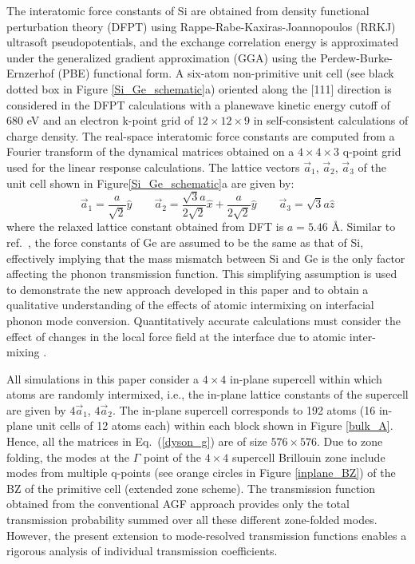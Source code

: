 \documentclass[11pt]{article}
\begin{document}
The interatomic force constants of Si are obtained from density functional perturbation theory (DFPT) using Rappe-Rabe-Kaxiras-Joannopoulos (RRKJ) ultrasoft pseudopotentials, and the exchange correlation energy is approximated under the generalized gradient approximation (GGA) using the Perdew-Burke-Ernzerhof (PBE) functional form. A six-atom non-primitive unit cell (see black dotted box in Figure \ref{Si_Ge_schematic}a) oriented along the [111] direction is considered in the DFPT calculations with a planewave kinetic energy cutoff of 680 eV and an electron k-point grid of $12\times 12\times 9$ in self-consistent calculations of charge density. The real-space interatomic force constants are computed from a Fourier transform of the dynamical matrices obtained on a $4\times 4\times 3$ q-point grid used for the linear response calculations. The lattice vectors $\vec{a}_1$, $\vec{a}_2$, $\vec{a}_3$ of the unit cell shown in Figure\ref{Si_Ge_schematic}a are given by:
\begin{equation}
\vec{a}_1 = \frac{a}{\sqrt{2}} \hat{y} \qquad \vec{a}_2 = \frac{\sqrt{3}a}{2\sqrt{2}}\hat{x}+\frac{a}{2\sqrt{2}}\hat{y} \qquad \vec{a}_3 = \sqrt{3}a\hat{z}
\end{equation}
where the relaxed lattice constant obtained from DFT is $a = 5.46$ $\text{\AA}$. Similar to ref.~\cite{tian2012enhancing}, the force constants of Ge are assumed to be the same as that of Si, effectively implying that the mass mismatch between Si and Ge is the only factor affecting the phonon transmission function. This simplifying assumption is used to demonstrate the new approach developed in this paper and to obtain a qualitative understanding of the effects of atomic intermixing on interfacial phonon mode conversion. Quantitatively accurate calculations must consider the effect of changes in the local force field at the interface due to atomic inter-mixing \cite{gu2015phonon}.

All simulations in this paper consider a $4 \times 4$ in-plane supercell within which atoms are randomly intermixed, i.e., the in-plane lattice constants of the supercell are given by $4\vec{a}_1$, $4\vec{a}_2$. The in-plane supercell corresponds to 192 atoms (16 in-plane  unit cells of 12 atoms each) within each block shown in Figure \ref{bulk_A}. Hence, all the matrices in Eq.~(\ref{dyson_g}) are of size $576\times 576$. Due to zone folding, the modes at the $\Gamma$ point of the $4 \times 4$ supercell Brillouin zone include modes from multiple q-points (see orange circles in Figure \ref{inplane_BZ}) of the BZ of the primitive cell (extended zone scheme). The transmission function obtained from the conventional AGF approach provides only the total transmission probability summed over all these different zone-folded modes. However, the present extension to mode-resolved transmission functions enables a rigorous analysis of individual transmission coefficients. 
\end{document}
